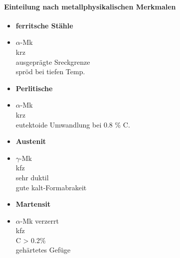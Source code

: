 \documentclass[12pt,twocolumn]{article}
\begin{document}
    \paragraph{Einteilung nach metallphysikalischen Merkmalen }
    \begin{minipage}[t]{0.5\columnwidth}
        \begin{itemize}[label={}, leftmargin=*, itemsep=0.01em]
            \item \textbf{ferritsche Stähle}
            \item $\alpha$-Mk \\ krz \\ ausgeprägte Sreckgrenze \\ spröd bei tiefen Temp.
        \end{itemize}
    \end{minipage}\hfill
    \begin{minipage}[t]{0.5\columnwidth}
        \begin{itemize}[label={}, leftmargin=*,  itemsep=0.01em]
            \item \textbf{Perlitische}
            \item $\alpha$-Mk \\ krz \\ eutektoide Umwandlung bei 0.8 \% C.
        \end{itemize}
    \end{minipage}
    \begin{minipage}[t]{0.5\columnwidth}
        \begin{itemize}[label={}, leftmargin=*, itemsep=0.01em]
            \item \textbf{Austenit}
            \item $\gamma$-Mk \\ kfz \\ sehr duktil \\ gute kalt-Formabrakeit
        \end{itemize}
    \end{minipage}\hfill
    \begin{minipage}[t]{0.5\columnwidth}
        \begin{itemize}[label={}, leftmargin=*,  itemsep=0.01em]
            \item \textbf{Martensit}
            \item $\alpha$-Mk verzerrt \\ kfz \\ C > 0.2\% \\ gehärtetes Gefüge
        \end{itemize} 
    \end{minipage}\hfill
\end{document}
